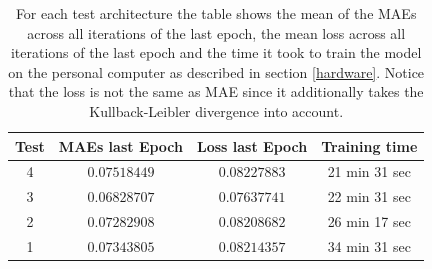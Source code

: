 \begin{center}
    \begin{table}[H]
        \centering
        \begin{tabular}{ | c | c | c | c | }
            \hline
            Test &MAEs last Epoch & Loss last Epoch & Training time\\ \hline
            4 & $0.07518449$  & $0.08227883$  & 21 min 31 sec  \\
            3 & $0.06828707$  & $0.07637741$  & 22 min 31 sec  \\
            2 & $0.07282908$  & $0.08208682$  & 26 min 17 sec  \\  
            1 & $0.07343805$  & $0.08214357$  & 34 min 31 sec  \\  
            \hline
        \end{tabular} 
        \caption{For each test architecture the table shows the mean of the MAEs across all iterations of the last
        epoch, the mean loss across all iterations of the last epoch and the time it took to train the model
        on the personal computer as described in section \ref{hardware}. Notice that the loss is not the same
        as MAE since it additionally takes the Kullback-Leibler divergence into account.}
    \end{table} \label{table_maes2}
\end{center}

